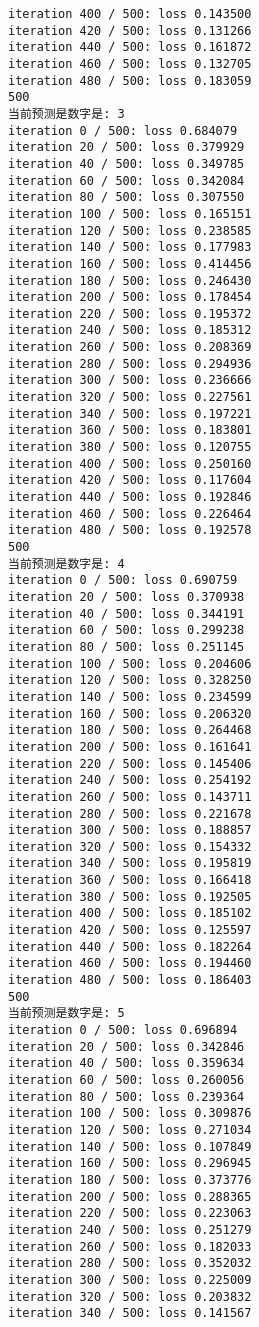 \documentclass[11pt]{article}
\begin{document}
\begin{Verbatim}[commandchars=\\\{\}]
iteration 400 / 500: loss 0.143500
iteration 420 / 500: loss 0.131266
iteration 440 / 500: loss 0.161872
iteration 460 / 500: loss 0.132705
iteration 480 / 500: loss 0.183059
500
当前预测是数字是: 3
iteration 0 / 500: loss 0.684079
iteration 20 / 500: loss 0.379929
iteration 40 / 500: loss 0.349785
iteration 60 / 500: loss 0.342084
iteration 80 / 500: loss 0.307550
iteration 100 / 500: loss 0.165151
iteration 120 / 500: loss 0.238585
iteration 140 / 500: loss 0.177983
iteration 160 / 500: loss 0.414456
iteration 180 / 500: loss 0.246430
iteration 200 / 500: loss 0.178454
iteration 220 / 500: loss 0.195372
iteration 240 / 500: loss 0.185312
iteration 260 / 500: loss 0.208369
iteration 280 / 500: loss 0.294936
iteration 300 / 500: loss 0.236666
iteration 320 / 500: loss 0.227561
iteration 340 / 500: loss 0.197221
iteration 360 / 500: loss 0.183801
iteration 380 / 500: loss 0.120755
iteration 400 / 500: loss 0.250160
iteration 420 / 500: loss 0.117604
iteration 440 / 500: loss 0.192846
iteration 460 / 500: loss 0.226464
iteration 480 / 500: loss 0.192578
500
当前预测是数字是: 4
iteration 0 / 500: loss 0.690759
iteration 20 / 500: loss 0.370938
iteration 40 / 500: loss 0.344191
iteration 60 / 500: loss 0.299238
iteration 80 / 500: loss 0.251145
iteration 100 / 500: loss 0.204606
iteration 120 / 500: loss 0.328250
iteration 140 / 500: loss 0.234599
iteration 160 / 500: loss 0.206320
iteration 180 / 500: loss 0.264468
iteration 200 / 500: loss 0.161641
iteration 220 / 500: loss 0.145406
iteration 240 / 500: loss 0.254192
iteration 260 / 500: loss 0.143711
iteration 280 / 500: loss 0.221678
iteration 300 / 500: loss 0.188857
iteration 320 / 500: loss 0.154332
iteration 340 / 500: loss 0.195819
iteration 360 / 500: loss 0.166418
iteration 380 / 500: loss 0.192505
iteration 400 / 500: loss 0.185102
iteration 420 / 500: loss 0.125597
iteration 440 / 500: loss 0.182264
iteration 460 / 500: loss 0.194460
iteration 480 / 500: loss 0.186403
500
当前预测是数字是: 5
iteration 0 / 500: loss 0.696894
iteration 20 / 500: loss 0.342846
iteration 40 / 500: loss 0.359634
iteration 60 / 500: loss 0.260056
iteration 80 / 500: loss 0.239364
iteration 100 / 500: loss 0.309876
iteration 120 / 500: loss 0.271034
iteration 140 / 500: loss 0.107849
iteration 160 / 500: loss 0.296945
iteration 180 / 500: loss 0.373776
iteration 200 / 500: loss 0.288365
iteration 220 / 500: loss 0.223063
iteration 240 / 500: loss 0.251279
iteration 260 / 500: loss 0.182033
iteration 280 / 500: loss 0.352032
iteration 300 / 500: loss 0.225009
iteration 320 / 500: loss 0.203832
iteration 340 / 500: loss 0.141567

\end{Verbatim}
\end{document}
